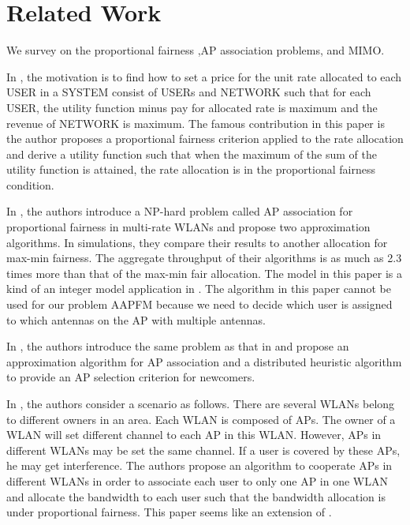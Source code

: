 \section{Related Work}
	We survey on the proportional fairness ,AP association problems, and MIMO.
	
	In \cite{kelly1997charging}, the motivation is to find how to set a price for the unit rate allocated to each USER in a SYSTEM consist of USERs and NETWORK such that for each USER, the utility function minus pay for allocated rate is maximum and the revenue of NETWORK is maximum. The famous contribution in this paper is the author proposes a proportional fairness criterion applied to the rate allocation and derive a utility function such that when the maximum of the sum of the utility function is attained, the rate allocation is in the proportional fairness condition.
	
	In \cite{li2008proportional}, the authors introduce a NP-hard problem called AP association for proportional fairness in multi-rate WLANs and propose two approximation algorithms. In simulations, they compare their results to another allocation for max-min fairness. The aggregate throughput of their algorithms is as much as 2.3 times more than that of the max-min fair allocation. The model in this paper is a kind of an integer model application in \cite{kelly1997charging}. The algorithm in this paper cannot be used for our problem AAPFM because we need to decide which user is assigned to which antennas on the AP with multiple antennas.

	In \cite{li2014ap}, the authors introduce the same problem as that in \cite{li2008proportional} and propose an approximation algorithm for AP association and a distributed heuristic algorithm to provide an AP selection criterion for newcomers.
	
	In \cite{baid2012network}, the authors consider a scenario as follows. There are several WLANs belong to different owners in an area. Each WLAN is composed of APs. The owner of a WLAN will set  different channel to each AP in this WLAN. However, APs in different WLANs may be set the same channel. If a user is covered by these APs, he may get interference. The authors propose an algorithm to cooperate APs in different WLANs in order to associate each user to only one AP in one WLAN and allocate the bandwidth to each user such that the bandwidth allocation is under proportional fairness. This paper seems like an extension of \cite{li2008proportional}.
	
